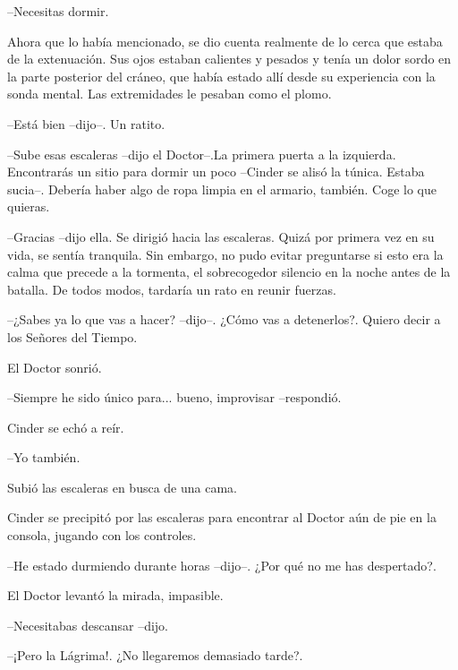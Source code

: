 --Necesitas dormir.



Ahora que lo había mencionado, se dio cuenta realmente de lo cerca que estaba de la extenuación. Sus ojos estaban calientes y pesados y tenía un dolor sordo en la parte posterior del cráneo, que había estado allí desde su experiencia con la sonda mental. Las extremidades le pesaban como el plomo. 



--Está bien --dijo--. Un ratito.

--Sube esas escaleras --dijo el Doctor--.La primera puerta a la izquierda. Encontrarás un sitio para dormir un poco --Cinder se alisó la túnica. Estaba sucia--. Debería haber algo de ropa limpia en el armario, también. Coge lo que quieras.

--Gracias --dijo ella. Se dirigió hacia las escaleras. Quizá por primera vez en su vida, se sentía tranquila. Sin embargo, no pudo evitar preguntarse si esto era la calma que precede a la tormenta, el sobrecogedor silencio en la noche antes de la batalla. De todos modos, tardaría un rato en reunir fuerzas.

--¿Sabes ya lo que vas a hacer? --dijo--. ¿Cómo vas a detenerlos?. Quiero decir a los Señores del Tiempo.



El Doctor sonrió. 



--Siempre he sido único para... bueno, improvisar --respondió.



Cinder se echó a reír. 



--Yo también.



Subió las escaleras en busca de una cama.

Cinder se precipitó por las escaleras para encontrar al Doctor aún de pie en la consola, jugando con los controles. 



--He estado durmiendo durante horas --dijo--. ¿Por qué no me has despertado?.



El Doctor levantó la mirada, impasible. 



--Necesitabas descansar --dijo.

--¡Pero la Lágrima!. ¿No llegaremos demasiado tarde?.



